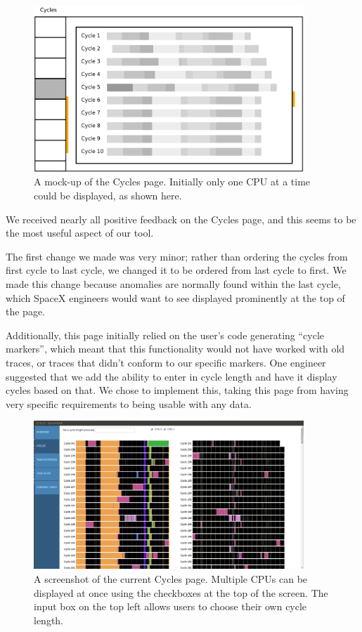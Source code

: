 \documentclass{hmcclinic}
\begin{document}
\begin{figure}[H]
\begin{center}
\includegraphics[width=4in]{oldcycles.png}
\caption{A mock-up of the Cycles page. Initially only one CPU at a time could be
displayed, as shown here.}
\end{center}
\end{figure}

We received nearly all positive feedback on the Cycles page, and this seems to
be the most useful aspect of our tool.

The first change  we made was very minor; rather than ordering the cycles from
first cycle to last cycle, we changed it to be ordered from last cycle to first.
We made this change because anomalies are normally found within the last cycle,
which SpaceX engineers would want to see displayed prominently at the top of the
page.

Additionally, this page initially relied on the user's code generating ``cycle
markers'', which meant that this functionality would not have worked with old
traces, or traces that didn't conform to our specific markers. One engineer
suggested that we add the ability to enter in cycle length and have it display
cycles based on that. We chose to implement this, taking this page from having
very specific requirements to being usable with any data.

\begin{figure}[H]
\begin{center}
\includegraphics[width=4in]{cycles-page.png}
\caption{A screenshot of the current Cycles page. Multiple CPUs can be displayed
at once using the checkboxes at the top of the screen. The input box on the top
left allows users to choose their own cycle length.}
\end{center}
\end{figure}
\end{document}
